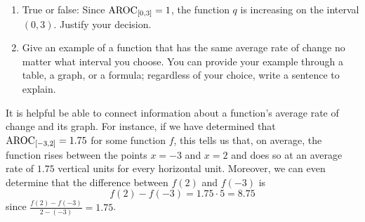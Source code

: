 \documentclass[nooutcomes]{ximera}
\begin{document}
\begin{exploration}
\begin{enumerate}[label=\alph*.]
\item True or false: Since $\mathrm{AROC}_{[0,3]} = 1$, the function $q$ is increasing on the interval $(0,3)$.  Justify your decision.
\item Give an example of a function that has the same average rate of change no matter what interval you choose. You can provide your example through a table, a graph, or a formula; regardless of your choice, write a sentence to explain.
\end{enumerate}

\end{exploration}

It is helpful be able to connect information about a function's average rate of change and its graph.  For instance, if we have determined that $\mathrm{AROC}_{[-3,2]} = 1.75$ for some function $f$, this tells us that, on average, the function rises between the points $x = -3$ and $x = 2$ and does so at an average rate of $1.75$ vertical units for every horizontal unit.  Moreover, we can even determine that the difference between $f(2)$ and $f(-3)$ is%
\begin{equation*}
f(2)-f(-3) = 1.75 \cdot 5 = 8.75
\end{equation*}
since $\frac{f(2)-f(-3)}{2-(-3)} = 1.75$.
\end{document}
